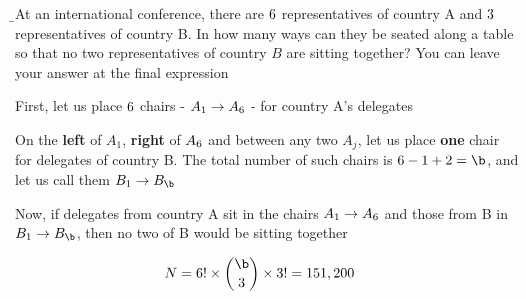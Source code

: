 



\SUBTRACT{}\a
\ADD{}\b

\question[5] At an international conference, there are $6$ representatives of country A and $3$ representatives 
of country B. In how many ways can they be seated along a table so that no two representatives of country $B$ 
are sitting together? You can leave your answer at the final expression


\watchout[-30pt]

\begin{solution}[\halfpage]
   First, let us place $6$ chairs - $A_1\rightarrow A_{6}$ - for country A's delegates

   On the \textbf{left} of $A_1$, \textbf{right} of $A_{6}$ and between any two $A_j$, 
   let us place \textbf{one} chair for delegates of country B. The total number of such chairs is 
   $\vbone - 1 + 2 = \b$, and let us call them $B_1\rightarrow B_{\b}$

   Now, if delegates from country A sit in the chairs $A_1\rightarrow A_{6}$ and those from 
   B in $B_1\rightarrow B_{\b}$, then no two of B would be sitting together

   \begin{align}
     N &= \vbone ! \times\binom\b\vbtwo\times\vbtwo ! = \vbthree
   \end{align}

\end{solution}

